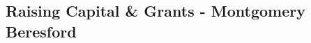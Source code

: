 \documentclass[11pt]{article}		%
\begin{document}
		            
				
				
			    
		\subsection[Raising Capital \& Grants]{Raising Capital \& Grants - Montgomery Beresford} \label{raisingFunds}
		
\end{document}
